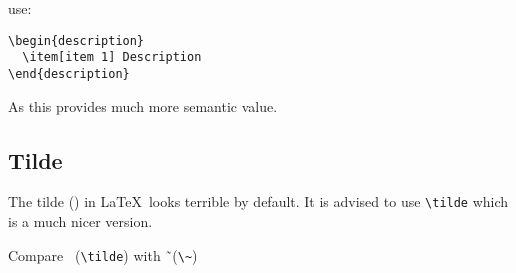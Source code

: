 \documentclass[11pt,a4paper]{article}
\begin{document}
use:

\begin{verbatim}
\begin{description}
  \item[item 1] Description
\end{description}
\end{verbatim}

As this provides much more semantic value.

\subsection{Tilde}
\label{sec:tilde}

The tilde (\tilde) in \LaTeX\ looks terrible by default. It is advised to use
\verb|\tilde| which is a much nicer version.

Compare \tilde\ (\verb|\tilde|) with \~\ (\verb|\~|)
\end{document}
